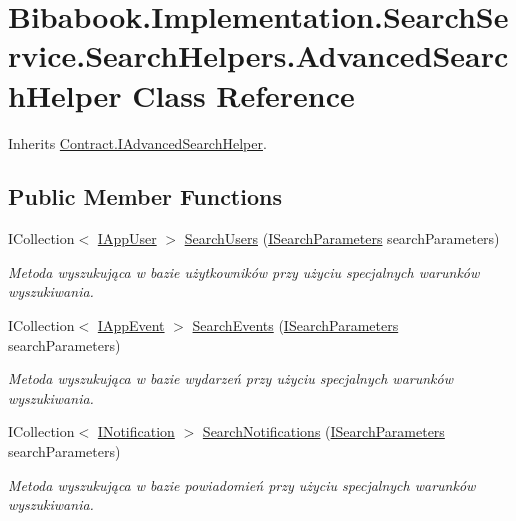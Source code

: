 \hypertarget{class_bibabook_1_1_implementation_1_1_search_service_1_1_search_helpers_1_1_advanced_search_helper}{}\section{Bibabook.\+Implementation.\+Search\+Service.\+Search\+Helpers.\+Advanced\+Search\+Helper Class Reference}
\label{class_bibabook_1_1_implementation_1_1_search_service_1_1_search_helpers_1_1_advanced_search_helper}


Inherits \hyperlink{interface_contract_1_1_i_advanced_search_helper}{Contract.\+I\+Advanced\+Search\+Helper}.

\subsection*{Public Member Functions}
\begin{DoxyCompactItemize}
\item 
I\+Collection$<$ \hyperlink{interface_contract_1_1_i_app_user}{I\+App\+User} $>$ \hyperlink{class_bibabook_1_1_implementation_1_1_search_service_1_1_search_helpers_1_1_advanced_search_helper_ab02a91ef566b046b1c262878d1526f3f}{Search\+Users} (\hyperlink{interface_contract_1_1_i_search_parameters}{I\+Search\+Parameters} search\+Parameters)
\begin{DoxyCompactList}\small\item\em Metoda wyszukująca w bazie użytkowników przy użyciu specjalnych warunków wyszukiwania. \end{DoxyCompactList}\item 
I\+Collection$<$ \hyperlink{interface_contract_1_1_i_app_event}{I\+App\+Event} $>$ \hyperlink{class_bibabook_1_1_implementation_1_1_search_service_1_1_search_helpers_1_1_advanced_search_helper_a76dca0f2fa9ac28f27f810bc9b2a9a34}{Search\+Events} (\hyperlink{interface_contract_1_1_i_search_parameters}{I\+Search\+Parameters} search\+Parameters)
\begin{DoxyCompactList}\small\item\em Metoda wyszukująca w bazie wydarzeń przy użyciu specjalnych warunków wyszukiwania. \end{DoxyCompactList}\item 
I\+Collection$<$ \hyperlink{interface_contract_1_1_i_notification}{I\+Notification} $>$ \hyperlink{class_bibabook_1_1_implementation_1_1_search_service_1_1_search_helpers_1_1_advanced_search_helper_ae056d1d973a77ac9de5f89705b2996cd}{Search\+Notifications} (\hyperlink{interface_contract_1_1_i_search_parameters}{I\+Search\+Parameters} search\+Parameters)
\begin{DoxyCompactList}\small\item\em Metoda wyszukująca w bazie powiadomień przy użyciu specjalnych warunków wyszukiwania. \end{DoxyCompactList}\end{DoxyCompactItemize}


